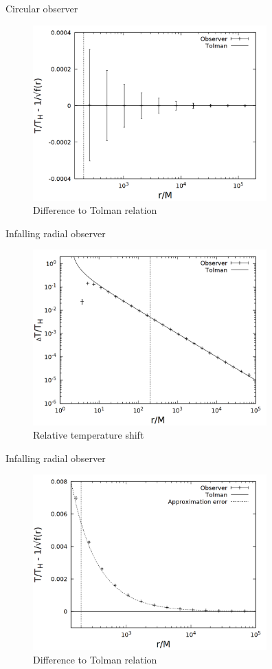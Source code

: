 \documentclass{beamer}
\begin{document}
\begin{frame}{Circular observer}
\begin{figure}
	\centering
    \includegraphics[width=9cm]{../cpp/final/circ_tolman.png}
    \caption{Difference to Tolman relation}
\end{figure}
\end{frame}

\begin{frame}{Infalling radial observer}
\begin{figure}
	\centering
    \includegraphics[width=9cm]{../cpp/final/rad.png}
    \caption{Relative temperature shift}
\end{figure}
\end{frame}

\begin{frame}{Infalling radial observer}
\begin{figure}
	\centering
    \includegraphics[width=9cm]{../cpp/final/rad_tolman_error_2.png}
    \caption{Difference to Tolman relation}
\end{figure}
\end{frame}
\end{document}
